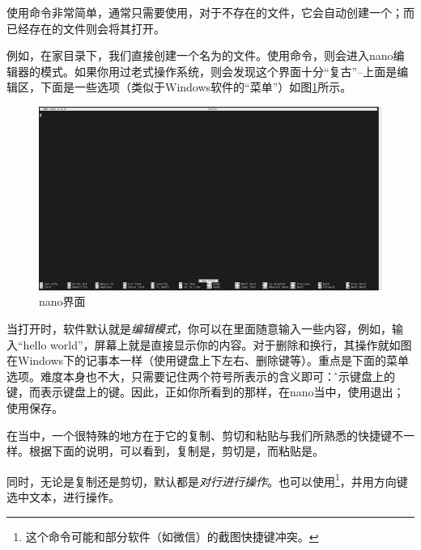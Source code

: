 使用命令非常简单，通常只需要使用，对于不存在的文件，它会自动创建一个；而已经存在的文件则会将其打开。

例如，在家目录下，我们直接创建一个名为的文件。使用命令，则会进入nano编辑器的模式。如果你用过老式操作系统，则会发现这个界面十分“复古”--上面是编辑区，下面是一些选项（类似于Windows软件的“菜单”）如图\ref{fig:使用nano简单创建文件-nano界面}所示。

\begin{figure}
    \centering
    \includegraphics[width=1\linewidth]{Linux基础/文本编辑工具vi和vim/使用nano简单创建文件/fig/nano界面.png}
    \caption{nano界面}
    \label{fig:使用nano简单创建文件-nano界面}
\end{figure}

当打开时，软件默认就是\emph{编辑模式}，你可以在里面随意输入一些内容，例如，输入“hello world”，屏幕上就是直接显示你的内容。对于删除和换行，其操作就如图在Windows下的记事本一样（使用键盘上下左右、删除键等）。重点是下面的菜单选项。难度本身也不大，只需要记住两个符号所表示的含义即可：\^表示键盘上的键，而表示键盘上的键。因此，正如你所看到的那样，在nano当中，使用退出；使用保存。

\begin{attention}
    在当中，一个很特殊的地方在于它的复制、剪切和粘贴与我们所熟悉的快捷键不一样。根据下面的说明，可以看到，复制是，剪切是，而粘贴是。

    同时，无论是复制还是剪切，默认都是\emph{对行进行操作}。也可以使用\footnote{这个命令可能和部分软件（如微信）的截图快捷键冲突。}，并用方向键选中文本，进行操作。
\end{attention}

